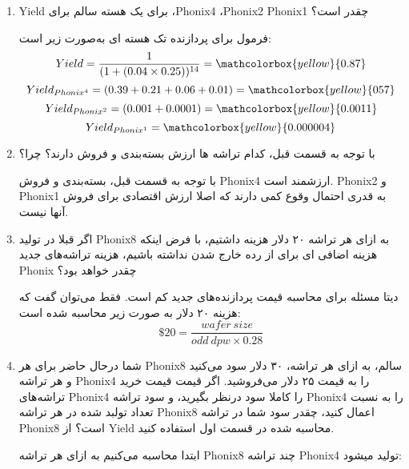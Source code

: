 \begin{enumerate}
	\item Yield برای یک هسته سالم برای ،Phonix4 ،Phonix2 Phonix1 چقدر است؟
	\begin{qsolve}
فرمول برای پردازنده تک هسته ای به‌صورت زیر است:
		\begin{equation}
			Yield = \frac{1}{(1 + (0.04 \times 0.25))^{14}} = \mathcolorbox{yellow}{0.87}
		\end{equation}
		\begin{equation}
			Yield_{Phonix^4} = (0.39+0.21+0.06+0.01)=\mathcolorbox{yellow}{057}
		\end{equation}
		\begin{equation}
			Yield_{Phonix^2} = (0.001+0.0001)=\mathcolorbox{yellow}{0.0011}
		\end{equation}
		\begin{equation}
			Yield_{Phonix^1} = \mathcolorbox{yellow}{0.000004}
		\end{equation}
	\end{qsolve}
	
	
	
	
	\item با توجه به قسمت قبل،‌ کدام تراشه ها ارزش بسته‌بندی و فروش دارند؟ چرا؟
	\begin{qsolve}
		با توجه به قسمت قبل، بسته‌بندی و فروش Phonix4 ارزشمند است. Phonix2 و Phonix1 به قدری احتمال وقوع کمی دارند که اصلا ارزش اقتصادی برای فروش آنها نیست.
	\end{qsolve}
	
	
	
	
	\item اگر قبلا در تولید Phonix8 به ازای هر تراشه ۲۰ دلار هزینه داشتیم، با فرض اینکه هزینه اضافی ای برای از رده خارج شدن نداشته باشیم، هزینه تراشه‌های جدید Phonix چقدر خواهد بود؟
	
	\begin{qsolve}
دیتا مسئله برای محاسبه قیمت پردازنده‌های جدید کم است. فقط می‌توان گفت که هزینه ۲۰ دلار به صورت زیر محاسبه شده است:
		\begin{equation}
			\$20=\frac{wafer \ size}{odd \ dpw \times 0.28}
		\end{equation}
	\end{qsolve}
	
	
	
	
	
	
	
	
	
	
	
	
	\item شما درحال حاضر برای هر Phonix8 سالم، به ازای هر تراشه، ۳۰ دلار سود می‌کنید و هر تراشه Phonix4 را به قیمت ۲۵ دلار می‌فروشید. اگر قیمت قیمت خرید تراشه‌های Phonix4 را کاملا سود درنظر بگیرید، و سود تراشه Phonix4 را به نسبت تعداد تولبد شده در هر تراشه Phonix8 اعمال کنید، چقدر سود شما در تراشه Phonix8 است؟ از Yield محاسبه شده در قسمت اول استفاده کنید.
	\begin{qsolve}
	ابتدا محاسبه می‌کنیم به ازای هر تراشه Phonix8 چند تراشه Phonix4 تولید میشود:
	

\end{qsolve}
\end{enumerate}
